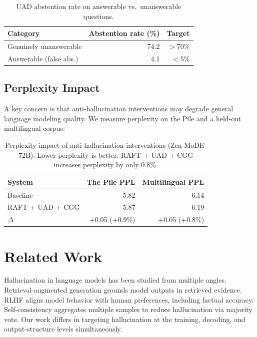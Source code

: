 \documentclass[11pt,a4paper]{article}
\begin{document}
\begin{table}[H]
\centering
\caption{UAD abstention rate on answerable vs.\ unanswerable questions.}
\begin{tabular}{lrr}
\toprule
\textbf{Category} & \textbf{Abstention rate (\%)} & \textbf{Target} \\
\midrule
Genuinely unanswerable    & 74.2 & $>$70\% \\
Answerable (false abs.)   & 4.1  & $<$5\% \\
\bottomrule
\end{tabular}
\label{tab:abstention}
\end{table}

\subsection{Perplexity Impact}

A key concern is that anti-hallucination interventions may degrade general language
modeling quality. We measure perplexity on the Pile and a held-out multilingual corpus:

\begin{table}[H]
\centering
\caption{Perplexity impact of anti-hallucination interventions (Zen MoDE-72B).
Lower perplexity is better. RAFT + UAD + CGG increases perplexity by only 0.8\%.}
\begin{tabular}{lrr}
\toprule
\textbf{System} & \textbf{The Pile PPL} & \textbf{Multilingual PPL} \\
\midrule
Baseline          & 5.82 & 6.14 \\
RAFT + UAD + CGG  & 5.87 & 6.19 \\
$\Delta$          & +0.05 (+0.9\%) & +0.05 (+0.8\%) \\
\bottomrule
\end{tabular}
\label{tab:perplexity}
\end{table}

\section{Related Work}
\label{sec:related}

Hallucination in language models has been studied from multiple angles. Retrieval-augmented
generation \cite{lewis2020retrieval} grounds model outputs in retrieved evidence.
RLHF \cite{ouyang2022training} aligns model behavior with human preferences, including
factual accuracy. Self-consistency \cite{wang2022selfconsistency} aggregates multiple
samples to reduce hallucination via majority vote. Our work differs in targeting
hallucination at the training, decoding, and output-structure levels simultaneously.
\end{document}
